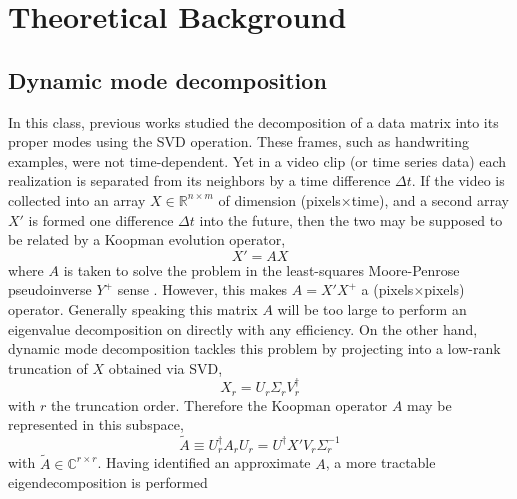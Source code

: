 \documentclass{article}
\begin{document}

\section{Theoretical Background}\label{theory}
\subsection{Dynamic mode decomposition}
In this class, previous works studied the decomposition of a data matrix into its proper modes using the SVD operation. These frames, such as handwriting examples, were not time-dependent. Yet in a video clip (or time series data) each realization is separated from its neighbors by a time difference $\Delta t$. If the video is collected into an array $X\in\mathbb{R}^{n\times m}$ of dimension (pixels$\times$time), and a second array $X'$ is formed one difference $\Delta t$ into the future, then the two may be supposed to be related by a Koopman evolution operator,
\begin{equation}
  X' = AX
\end{equation}
where $A$ is taken to solve the problem in the least-squares Moore-Penrose pseudoinverse $Y^+$ sense \cite{kutz}. However, this makes $A = X'X^+$ a (pixels$\times$pixels) operator. Generally speaking this matrix $A$ will be too large to perform an eigenvalue decomposition on directly with any efficiency. On the other hand, dynamic mode decomposition tackles this problem by projecting into a low-rank truncation of $X$ obtained via SVD,
\begin{equation}
  X_r = U_r\Sigma_rV_r^\dagger
\end{equation}
with $r$ the truncation order. Therefore the Koopman operator $A$ may be represented in this subspace,
\begin{equation}
  \widetilde{A} \equiv U_r^\dagger A_rU_r = U^\dagger X'V_r\Sigma_r^{-1}
\end{equation}
with $\widetilde{A}\in\mathbb{C}^{r\times r}$. Having identified an approximate $A$, a more tractable eigendecomposition is performed
\end{document}
